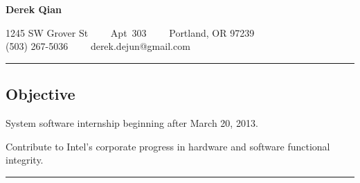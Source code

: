 \documentclass[10pt,letterpaper]{article}
\newenvironment{indentsection}[1]%
{\begin{list}{}%
	{\setlength{\leftmargin}{#1}}%
	\item[]%
}
{\end{list}}
\begin{document}
\begin{center}
{\LARGE \textbf{Derek Qian}}

1245 SW Grover St\ \ \textbullet
\ \ Apt\ 303\ \ \textbullet
\ \ Portland, OR 97239
\\
(503) 267-5036\ \ \textbullet
\ \ derek.dejun@gmail.com
\end{center}

\hrule
\vspace{-0.4em}
\subsection*{Objective}
\begin{itemize*}
	\item System software internship beginning after March 20, 2013.
	\item Contribute to Intel's corporate progress in hardware and software functional integrity.
\end{itemize*}

\hrule
\vspace{-0.4em}
\end{document}

